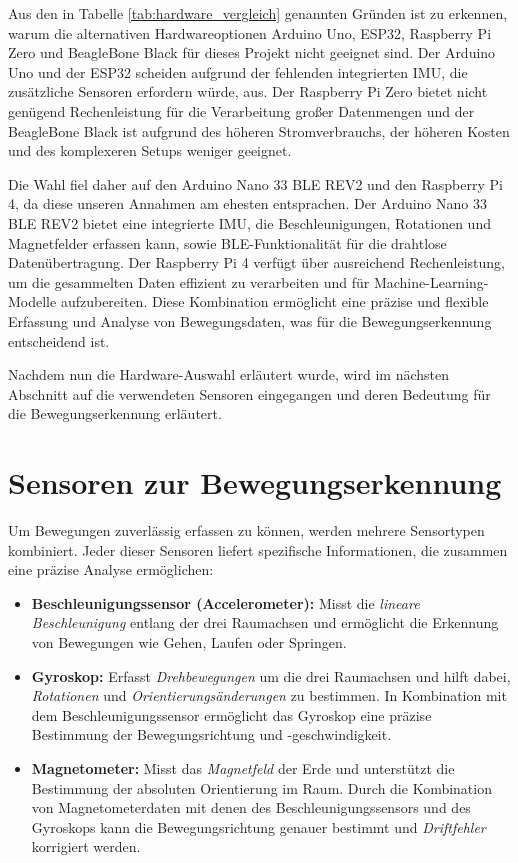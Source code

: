 Aus den in Tabelle \ref{tab:hardware_vergleich} genannten Gründen ist zu erkennen, warum die alternativen Hardwareoptionen Arduino Uno, ESP32, Raspberry Pi Zero und BeagleBone Black für dieses Projekt nicht geeignet sind. Der Arduino Uno und der ESP32 scheiden aufgrund der fehlenden integrierten IMU, die zusätzliche Sensoren erfordern würde, aus. Der Raspberry Pi Zero bietet nicht genügend Rechenleistung für die Verarbeitung großer Datenmengen und der BeagleBone Black ist aufgrund des höheren Stromverbrauchs, der höheren Kosten und des komplexeren Setups weniger geeignet.

Die Wahl fiel daher auf den Arduino Nano 33 BLE REV2 und den Raspberry Pi 4, da diese unseren Annahmen am ehesten entsprachen. Der Arduino Nano 33 BLE REV2 bietet eine integrierte IMU, die Beschleunigungen, Rotationen und Magnetfelder erfassen kann, sowie BLE-Funktionalität für die drahtlose Datenübertragung. Der Raspberry Pi 4 verfügt über ausreichend Rechenleistung, um die gesammelten Daten effizient zu verarbeiten und für Machine-Learning-Modelle aufzubereiten. Diese Kombination ermöglicht eine präzise und flexible Erfassung und Analyse von Bewegungsdaten, was für die Bewegungserkennung entscheidend ist.

Nachdem nun die Hardware-Auswahl erläutert wurde, wird im nächsten Abschnitt auf die verwendeten Sensoren eingegangen und deren Bedeutung für die Bewegungserkennung erläutert.

\section{Sensoren zur Bewegungserkennung}

Um Bewegungen zuverlässig erfassen zu können, werden mehrere Sensortypen kombiniert. Jeder dieser Sensoren liefert spezifische Informationen, die zusammen eine präzise Analyse ermöglichen:

\begin{itemize}
	\item \textbf{Beschleunigungssensor (Accelerometer):} Misst die \emph{lineare Beschleunigung} entlang der drei Raumachsen und ermöglicht die Erkennung von Bewegungen wie Gehen, Laufen oder Springen.
	\item \textbf{Gyroskop:} Erfasst \emph{Drehbewegungen} um die drei Raumachsen und hilft dabei, \emph{Rotationen} und \emph{Orientierungsänderungen} zu bestimmen. In Kombination mit dem Beschleunigungssensor ermöglicht das Gyroskop eine präzise Bestimmung der Bewegungsrichtung und -geschwindigkeit.
	\item \textbf{Magnetometer:} Misst das \emph{Magnetfeld} der Erde und unterstützt die Bestimmung der absoluten Orientierung im Raum. Durch die Kombination von Magnetometerdaten mit denen des Beschleunigungssensors und des Gyroskops kann die Bewegungsrichtung genauer bestimmt und \emph{Driftfehler} korrigiert werden. 
\end{itemize}



